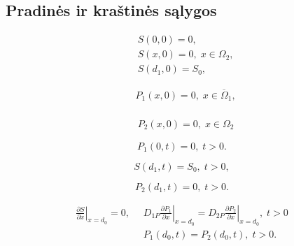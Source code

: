 \documentclass[12pt, a4paper, lithuanian]{article}
\begin{document}
\subsection{Pradinės ir kraštinės sąlygos}
\begin{equation}
\begin{aligned}
    &S(0,0) = 0, \\
    &S(x, 0) = 0,\; x \in \Omega_2,\\
    &S(d_1, 0) = S_0,
\end{aligned}
\end{equation}

\begin{equation}
\begin{aligned}
    &P_1(x, 0) = 0,\; x \in \overline\Omega_1,\\
\end{aligned}
\end{equation}

\begin{equation}
\begin{aligned}
    & P_2(x, 0) = 0,\; x \in \Omega_2%
\end{aligned}
\end{equation}

\begin{equation} 
    P_1(0,t)=0, \; t>0.
\end{equation}


\begin{equation} 
    S(d_1, t) = S_0,\; t>0,
\end{equation}

\begin{equation} 
    P_2(d_1, t) = 0,\; t>0.
\end{equation}

\begin{equation} 
\begin{aligned}
    \left. \frac{\partial S}{\partial x} \right|_{x=d_0} = 0, \;\;
    & \left. D_{1P} \frac{\partial P_1}{\partial x} \right|_{x=d_0} = 
    \left. D_{2P} \frac{\partial P_2}{\partial x} \right|_{x=d_0},\; t > 0 \\
    & P_1(d_0, t) = P_2(d_0, t),\; t>0.
\end{aligned}
\end{equation}
\end{document}
